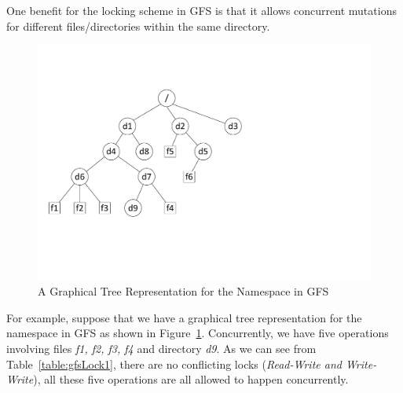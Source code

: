 \noindent One benefit for the locking scheme in GFS is that it allows concurrent mutations for different files/directories within the same directory. 

\begin{figure}[ht]
	\centering
	\includegraphics[scale=0.7]{figs/gfstree.pdf}
	\caption{A Graphical Tree Representation for the Namespace in GFS}
	\label{fig:gfsTree}
\end{figure}

\noindent For example, suppose that we have a graphical tree representation for the namespace in GFS as shown in Figure~\ref{fig:gfsTree}. Concurrently, we have five operations involving files \textit{f1, f2, f3, f4} and directory \textit{d9}. As we can see from Table~\ref{table:gfsLock1}, there are no conflicting locks (\textit{Read-Write and Write-Write}), all these five operations are all allowed to happen concurrently.

